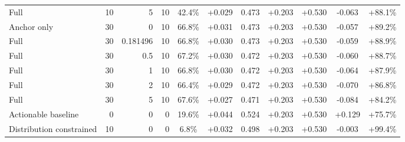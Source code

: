 \begin{table}[htbp]
\begin{tabular}{lrrrccccccc}
Full & 10 & 5 & 10 & 42.4\% & +0.029 & 0.473 & +0.203 & +0.530 & -0.063 & +88.1\% \\
Anchor only & 30 & 0 & 10 & 66.8\% & +0.031 & 0.473 & +0.203 & +0.530 & -0.057 & +89.2\% \\
Full & 30 & 0.181496 & 10 & 66.8\% & +0.030 & 0.473 & +0.203 & +0.530 & -0.059 & +88.9\% \\
Full & 30 & 0.5 & 10 & 67.2\% & +0.030 & 0.472 & +0.203 & +0.530 & -0.060 & +88.7\% \\
Full & 30 & 1 & 10 & 66.8\% & +0.030 & 0.472 & +0.203 & +0.530 & -0.064 & +87.9\% \\
Full & 30 & 2 & 10 & 66.4\% & +0.029 & 0.472 & +0.203 & +0.530 & -0.070 & +86.8\% \\
Full & 30 & 5 & 10 & 67.6\% & +0.027 & 0.471 & +0.203 & +0.530 & -0.084 & +84.2\% \\
Actionable baseline & 0 & 0 & 0 & 19.6\% & +0.044 & 0.524 & +0.203 & +0.530 & +0.129 & +75.7\% \\
Distribution constrained & 10 & 0 & 0 & 6.8\% & +0.032 & 0.498 & +0.203 & +0.530 & -0.003 & +99.4\% \\
\bottomrule
\end{tabular}
\end{table}